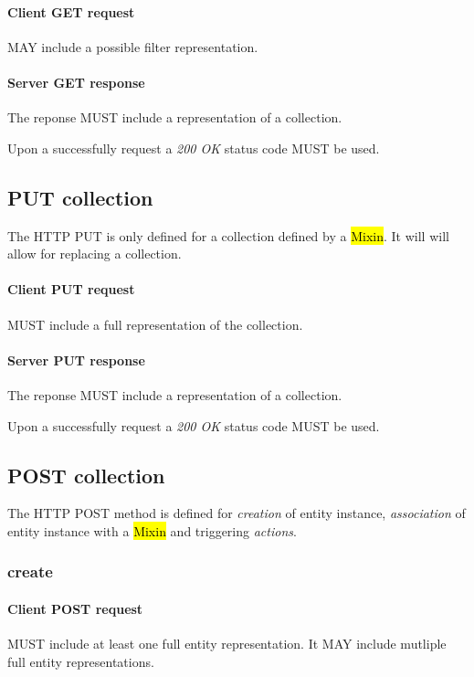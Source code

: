 \documentclass[10pt,a4paper]{article}
\begin{document}
\paragraph{Client GET request}
MAY include a possible filter representation.

\paragraph{Server GET response}
The reponse MUST include a representation of a collection.

Upon a successfully request a \emph{200 OK} status code MUST be used.

\subsection{PUT collection}
The HTTP PUT is only defined for a collection defined by a \hl{Mixin}. It will will allow for replacing a collection.

\paragraph{Client PUT request}
MUST include a full representation of the collection.

\paragraph{Server PUT response}
The reponse MUST include a representation of a collection.

Upon a successfully request a \emph{200 OK} status code MUST be used.

\subsection{POST collection}
The HTTP POST method is defined for {\em creation} of entity instance, {\em association} of entity instance with a \hl{Mixin} and triggering {\em actions}.

\subsubsection{create}

\paragraph{Client POST request}
MUST include at least one full entity representation. It MAY include mutliple full entity representations.
\end{document}
